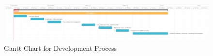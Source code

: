 \begin{figure}[H]
\begin{center}
\includegraphics[width=15cm]{figures/agile_gantt}
\end{center}
\caption{Gantt Chart for Development Process}
\label{fig:agile_gantt}
\end{figure}
